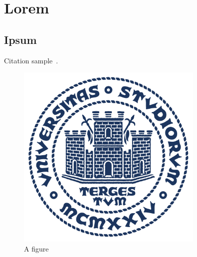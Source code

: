 \chapter{Lorem}\label{ch:lorem}

\section{Ipsum}\label{sec:ipsum}

    Citation sample~\cite{latexcompanion}.

    \begin{figure}[!ht]
        \centering
        \includegraphics[width=0.8\textwidth]{img/units_sigillo_pantone-534}
        \caption{A figure}
        \label{fig:example}
    \end{figure}

    \lipsum[3]

